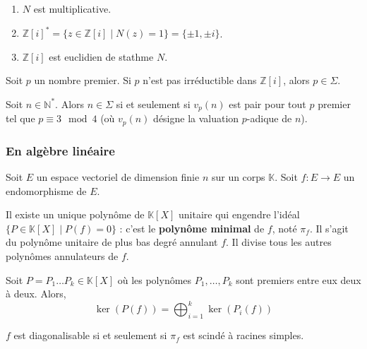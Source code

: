   \begin{lemma}
    \begin{enumerate}[label=(\roman*)]
      \item $N$ est multiplicative.
      \item $\mathbb{Z}[i]^* = \{ z \in \mathbb{Z}[i] \mid N(z) = 1 \} = \{ \pm 1, \pm i \}$.
      \item $\mathbb{Z}[i]$ est euclidien de stathme $N$.
    \end{enumerate}
  \end{lemma}

  \begin{lemma}
    Soit $p$ un nombre premier. Si $p$ n'est pas irréductible dans $\mathbb{Z}[i]$, alors $p \in \Sigma$.
  \end{lemma}


  \begin{theorem}
    Soit $n \in \mathbb{N}^*$. Alors $n \in \Sigma$ si et seulement si $v_p(n)$ est pair pour tout $p$ premier tel que $p \equiv 3 \mod 4$ (où $v_p(n)$ désigne la valuation $p$-adique de $n$).
  \end{theorem}

  \subsubsection{En algèbre linéaire}

  Soit $E$ un espace vectoriel de dimension finie $n$ sur un corps $\mathbb{K}$. Soit $f : E \rightarrow E$ un endomorphisme de $E$.


  \begin{application}
    Il existe un unique polynôme de $\mathbb{K}[X]$ unitaire qui engendre l'idéal $\{ P \in \mathbb{K}[X] \mid P(f) = 0 \}$ : c'est le \textbf{polynôme minimal} de $f$, noté $\pi_f$. Il s'agit du polynôme unitaire de plus bas degré annulant $f$. Il divise tous les autres polynômes annulateurs de $f$.
  \end{application}

  \begin{theorem}
    Soit $P = P_1 \dots P_k \in \mathbb{K}[X]$ où les polynômes $P_1, \dots, P_k$ sont premiers entre eux deux à deux. Alors,
    \[ \ker(P(f)) = \bigoplus_{i=1}^k \ker(P_i(f)) \]
  \end{theorem}

  \begin{application}
    $f$ est diagonalisable si et seulement si $\pi_f$ est scindé à racines simples.
  \end{application}


